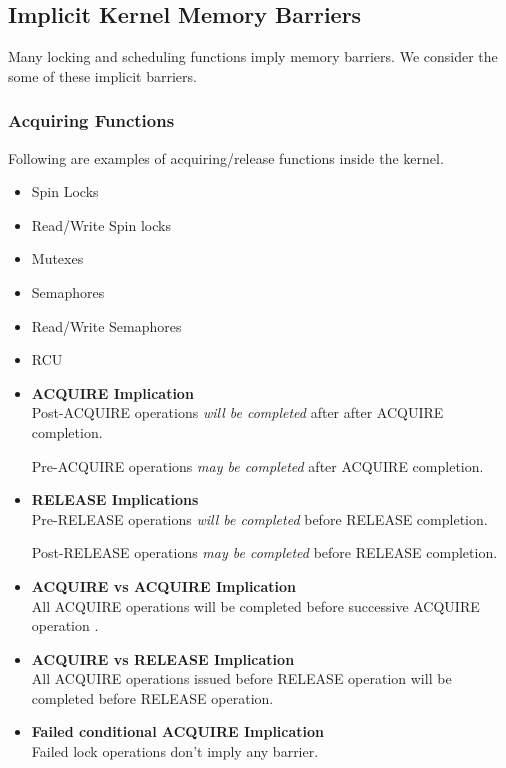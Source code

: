 \documentclass{article}
\begin{document}
\subsection{Implicit Kernel Memory Barriers}

Many locking and scheduling functions imply memory barriers. We
consider the some of these implicit barriers.

\subsubsection{Acquiring Functions}

Following are examples of acquiring/release functions inside the kernel.

\begin{itemize}
  \item Spin Locks
  \item Read/Write Spin locks
  \item Mutexes
  \item Semaphores
  \item Read/Write Semaphores
  \item RCU
\end{itemize}


\begin{itemize}  
\item \textbf{ACQUIRE Implication} \\

  Post-ACQUIRE operations \emph{will be completed} after after ACQUIRE
  completion.

  Pre-ACQUIRE operations \emph{may be completed} after ACQUIRE
  completion.
  
\item \textbf{RELEASE Implications} \\

  Pre-RELEASE operations \emph{will be completed} before RELEASE
  completion.

  Post-RELEASE operations \emph{may be completed} before RELEASE
  completion.

\item \textbf{ACQUIRE vs ACQUIRE Implication} \\

  All ACQUIRE operations will be completed before successive ACQUIRE
  operation .

\item \textbf{ACQUIRE vs RELEASE Implication} \\

  All ACQUIRE operations issued before RELEASE operation will be
  completed before RELEASE operation.

\item \textbf{Failed conditional ACQUIRE Implication} \\

  Failed lock operations don't imply any barrier.
  
\end{itemize}
\end{document}
